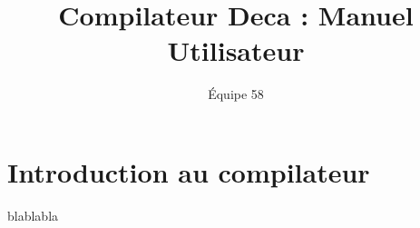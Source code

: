 \documentclass[a4paper]{article}
\begin{document}
\title{Compilateur Deca : Manuel Utilisateur}
\author{\'Equipe 58}
\maketitle
\section{Introduction au compilateur}
blablabla
\end{document}
